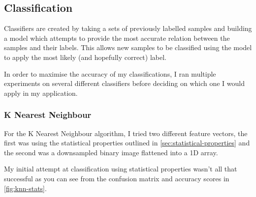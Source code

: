 \subsection{Classification}
\label{sec:implementation-classification}

Classifiers are created by taking a sets of previously labelled samples and building a model which attempts to provide the most accurate relation between the samples and their labels. This allows new samples to be classified using the model to apply the most likely (and hopefully correct) label.

In order to maximise the accuracy of my classifications, I ran multiple experiments on several different classifiers before deciding on which one I would apply in my application.

\subsubsection{K Nearest Neighbour}

For the K Nearest Neighbour algorithm, I tried two different feature vectors, the first was using the statistical properties outlined in \cref{sec:statistical-properties} and the second was a downsampled binary image flattened into a 1D array. 

My initial attempt at classification using statistical properties wasn't all that successful as you can see from the confusion matrix and accuracy scores in \cref{fig:knn-stats}.

